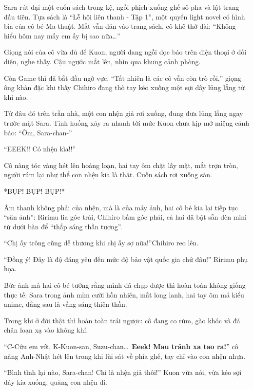 \documentclass[../main.tex]{subfiles}
\begin{document}
\ct

Sara rút đại một cuốn sách trong kệ, ngồi phịch xuống ghế sô-pha và lật trang đầu tiên. Tựa sách là ``Lễ hội liên thanh - Tập 1'', một quyển light novel có hình bìa của cô bé Ma thuật. Mắt vẫn dán vào trang sách, cô khẽ thở dài: ``Không hiểu hôm nay mấy em ấy bị sao nữa\dots''

Giọng nói của cô vừa đủ để Kuon, người đang ngồi đọc báo trên điện thoại ở đối diện, nghe thấy. Cậu ngước mắt lên, nhìn qua khung cảnh phòng.

Còn Game thì đã bắt đầu ngờ vực. ``Tất nhiên là các cô vẫn còn trò rồi,'' giọng ông khàn đặc khi thấy Chihiro đang thò tay kéo xuống một sợi dây lủng lẳng từ khi nào.

Từ đâu đó trên trần nhà, một con nhện giả rơi xuống, đung đưa lủng lẳng ngay trước mặt Sara. Tình huống xảy ra nhanh tới mức Kuon chưa kịp mở miệng cảnh báo: ``Ờm, Sara-chan-''

``EEEK!! Có nhện kìa!!''


Cô nàng tóc vàng hét lên hoảng loạn, hai tay ôm chặt lấy mặt, mắt trợn tròn, người rúm lại như thể con nhện kia là thật. Cuốn sách rơi xuống sàn.

*BỤP! BỤP! BỤP!*

Âm thanh không phải của nhện, mà là của máy ảnh, hai cô bé kia lại tiếp tục ``săn ảnh'': Ririmu lia góc trái, Chihiro bấm góc phải, cả hai đã bật sẵn đèn mini từ dưới bàn để ``thắp sáng thần tượng''.

``Chị ấy trông cũng dễ thương khi chị ấy sợ nữa!''Chihiro reo lên.

``Đồng ý! Đây là độ đáng yêu đến mức độ bảo vật quốc gia chứ đâu!'' Ririmu phụ họa.

Bức ảnh mà hai cô bé tưởng rằng mình đã chụp được thì hoàn toàn không giống thực tế: Sara trong ảnh mỉm cười hồn nhiên, mắt long lanh, hai tay ôm má kiểu anime, đằng sau là vầng sáng thiên thần.


Trong khi ở đời thật thì hoàn toàn trái ngược: cô đang co rúm, gào khóc và đá chân loạn xạ vào không khí.

``C-Cứu em với, K-Kuon-san, Suzu-chan\dots\ \textbf{Eeek! Mau tránh xa tao ra!}'' cô nàng Anh-Nhật hét lên trong khi lùi sát về phía ghế, tay chỉ vào con nhện nhựa.

``Bình tĩnh lại nào, Sara-chan! Chỉ là nhện giả thôi!'' Kuon vừa nói, vừa kéo sợi dây kia xuống, quăng con nhện đi.
\end{document}
